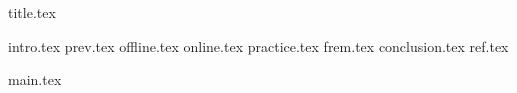 


\usepackage{tikz}
\usepackage{pgfplots}
\usepackage{graphicx}
\usepackage{subcaption}
\usepackage{amssymb}
\usepackage{dsfont}
\usepackage{amsmath}
\graphicspath{ {./images/} }
\usepackage{tikz}
\usepackage{pgfplots}
\usetikzlibrary{shadows,arrows.meta}

\DeclareMathOperator*{\argmax}{arg\,max}
\DeclareMathOperator*{\argmin}{arg\,min}


{title.tex}

\clearpage


\tableofcontents

\clearpage
{}
\pagestyle{fancy}
\setcounter{page}{6}

\clearpage

{intro.tex}
{prev.tex}
{offline.tex}
{online.tex}
{practice.tex}
{frem.tex}
{conclusion.tex}
{ref.tex}

\clearpage
{}
{}
\renewcommand\bibname{Перелік посилань}


{main.tex}


